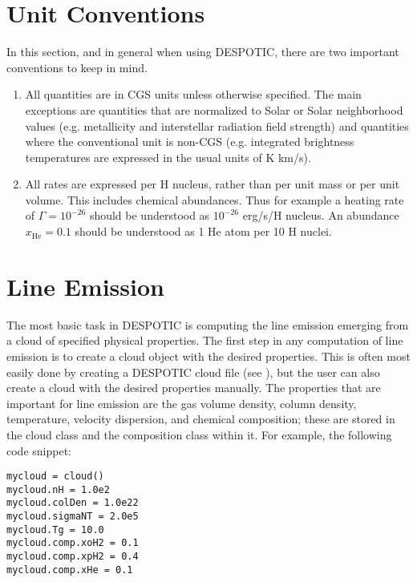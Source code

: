 \documentclass[letterpaper,10pt,english]{sphinxmanual}
\begin{document}
\section{Unit Conventions}
\label{functions:unit-conventions}
In this section, and in general when using DESPOTIC, there are two
important conventions to keep in mind.
\begin{enumerate}
\item {} 
All quantities are in CGS units unless otherwise specified. The
main exceptions are quantities that are normalized to Solar or Solar
neighborhood values (e.g. metallicity and interstellar radiation
field strength) and quantities where the conventional unit is
non-CGS (e.g. integrated brightness temperatures are expressed in
the usual units of K km/s).

\item {} 
All rates are expressed per H nucleus, rather than per unit mass or
per unit volume. This includes chemical abundances. Thus for
example a heating rate of \(\Gamma=10^{-26}\) should be
understood as \(10^{-26}\) erg/s/H nucleus. An abundance
\(x_{\mathrm{He}}=0.1\) should be understood as 1 He atom per
10 H nuclei.

\end{enumerate}


\section{Line Emission}
\label{functions:ssec-line-emission}\label{functions:line-emission}
The most basic task in DESPOTIC is computing the line emission
emerging from a cloud of specified physical properties. The first step
in any computation of line emission is to create a cloud object with
the desired properties. This is often most easily done by creating a
DESPOTIC cloud file (see {\hyperref[cloudfiles:sec\string-cloudfiles]{}}), but the user can also
create a cloud with the desired properties manually. The properties
that are important for line emission are the gas volume density,
column density, temperature, velocity dispersion, and chemical
composition; these are stored in the cloud class and the composition
class within it. For example, the following code snippet:

\begin{Verbatim}[commandchars=\\\{\}]
mycloud = cloud()
mycloud.nH = 1.0e2
mycloud.colDen = 1.0e22
mycloud.sigmaNT = 2.0e5
mycloud.Tg = 10.0
mycloud.comp.xoH2 = 0.1
mycloud.comp.xpH2 = 0.4
mycloud.comp.xHe = 0.1
\end{Verbatim}
\end{document}
